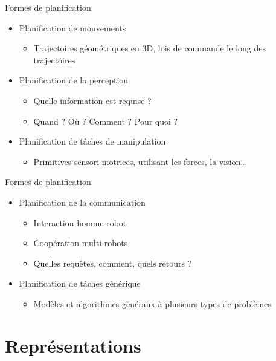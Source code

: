 \documentclass[compress]{beamer}
\begin{document}
\begin{frame}{Formes de planification}
\begin{itemize}
\item Planification de mouvements
	\begin{itemize}
	\item Trajectoires géométriques en 3D, lois de commande le long des trajectoires
	\end{itemize}
\item Planification de la perception
	\begin{itemize}
	\item Quelle information est requise ?
	\item Quand ? Où ? Comment ? Pour quoi ?
	\end{itemize}
\item Planification de tâches de manipulation
	\begin{itemize}
	\item Primitives sensori-motrices, utilisant les forces, la vision\dots
	\end{itemize}
\end{itemize}
\end{frame}

\begin{frame}{Formes de planification}
\begin{itemize}
\item Planification de la communication
	\begin{itemize}
	\item Interaction homme-robot
	\item Coopération multi-robots
	\item Quelles requêtes, comment, quels retours ?
	\end{itemize}
\item Planification de tâches générique
	\begin{itemize}
	\item Modèles et algorithmes généraux à plusieurs types de problèmes
	\end{itemize}
\end{itemize}
\end{frame}

\section{Représentations}
\begin{frame}
\tableofcontents[hideothersubsections]
\end{frame}
\end{document}
